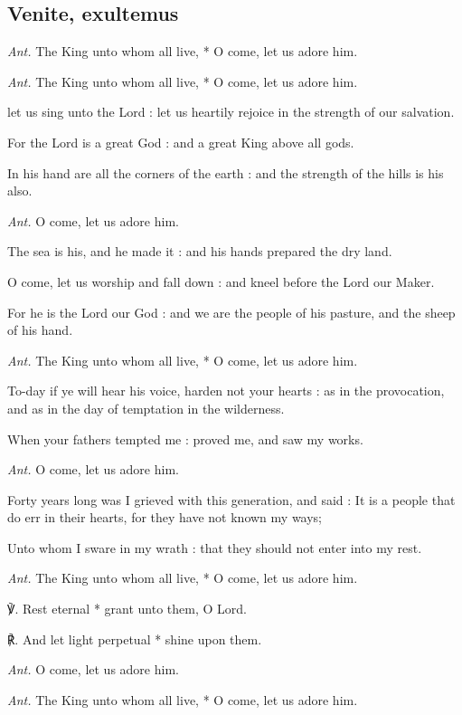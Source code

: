\subsection{Venite, exultemus}\par\noindent
\textit{Ant.} The King unto whom all live, * O come, let us adore him.\par
\textit{Ant.} The King unto whom all live, * O come, let us adore him.\par
{} let us sing unto the Lord : let us heartily rejoice in the strength of our salvation.\par
{}
For the Lord is a great God : and a great King above all gods.\par
{}In his hand are all the corners of the earth : and the strength of the hills is his also.\par
\textit{Ant.} O come, let us adore him.\par
{}The sea is his, and he made it : and his hands prepared the dry land.\par
{}O come, let us worship and fall down : and kneel before the Lord our Maker.\par
{}For he is the Lord our God : and we are the people of his pasture, and the sheep of his hand.\par
\textit{Ant.} The King unto whom all live, * O come, let us adore him.\par
{}To-day if ye will hear his voice, harden not your hearts : as in the provocation, and as in the day of temptation in the wilderness.\par
{}When your fathers tempted me : proved me, and saw my works.\par
\textit{Ant.} O come, let us adore him.\par
{}Forty years long was I grieved with this generation, and said : It is a people that do err in their hearts, for they have not known my ways;\par
{}Unto whom I sware in my wrath : that they should not enter into my rest.\par
\textit{Ant.} The King unto whom all live, * O come, let us adore him.\par
℣. Rest eternal * grant unto them, O Lord.\par
℟. And let light perpetual * shine upon them.\par
\textit{Ant.} O come, let us adore him.\par\noindent
\textit{Ant.} The King unto whom all live, * O come, let us adore him.\par


